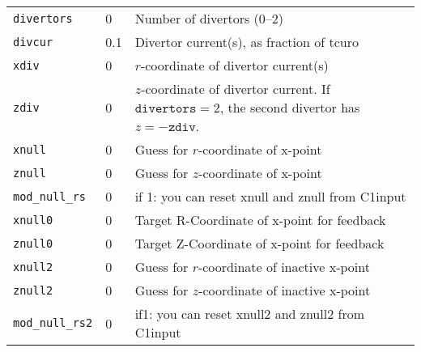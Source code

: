 \begin{tabular}{llp{4in}}
  \texttt{divertors} & 0  & Number of divertors (0--2)\\
  \texttt{divcur}& 0.1    & Divertor current(s), as fraction of tcuro\\
  \texttt{xdiv}  & 0      & $r$-coordinate of divertor current(s)\\
  \texttt{zdiv}  & 0      & \parbox[t]{4in}{$z$-coordinate of
    divertor 
    current.  If $\mathtt{divertors} = 2$, the second divertor has 
    $z = -\mathtt{zdiv}$.}\\
  \texttt{xnull}     & 0 & Guess for $r$-coordinate of x-point\\
  \texttt{znull}     & 0 & Guess for $z$-coordinate of x-point\\
  \texttt{mod\_null\_rs} & 0 & if 1: you can reset xnull and znull from C1input \\
  \texttt{xnull0}  &  0  & Target R-Coordinate of x-point for feedback \\
  \texttt{znull0}  &  0  & Target Z-Coordinate of x-point for feedback \\
  \texttt{xnull2}     & 0 & Guess for $r$-coordinate of inactive x-point\\
  \texttt{znull2}     & 0 & Guess for $z$-coordinate of inactive x-point\\
  \texttt{mod\_null\_rs2} & 0 & if1: you can reset xnull2 and znull2 from C1input \\
  \end{tabular}

